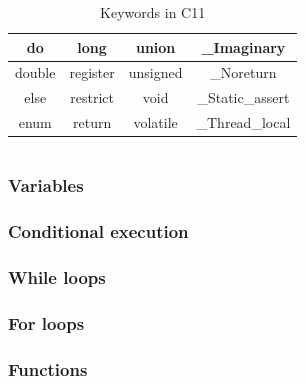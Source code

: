 \documentclass{beamer}
\begin{document}
\begin{frame}
\begin{columns}
\begin{table}
{{\begin{tabular}{| c | c | c | c |}
                \hline
                do          & long      & union     & \_Imaginary \\
                \hline
                double      & register  & unsigned  & \_Noreturn  \\
                \hline
                else        & restrict  & void      & \_Static\_assert  \\
                \hline
                enum        & return    & volatile  & \_Thread\_local  \\
                \hline
            \end{tabular}}}
            \caption{Keywords in C11}
        \end{table}
    \end{columns}
\end{frame}

\begin{frame}
    \frametitle{Variables}
    \begin{figure}
        
    \end{figure}
\end{frame}

\begin{frame}
    \frametitle{Conditional execution}
    \begin{figure}
        
    \end{figure}
\end{frame}

\begin{frame}
    \frametitle{While loops}
    \begin{figure}
        
    \end{figure}
\end{frame}

\begin{frame}
    \frametitle{For loops}
    \begin{figure}
        
    \end{figure}
\end{frame}

\begin{frame}
    \frametitle{Functions}
    \begin{figure}
        
    \end{figure}
\end{frame}
\end{document}
